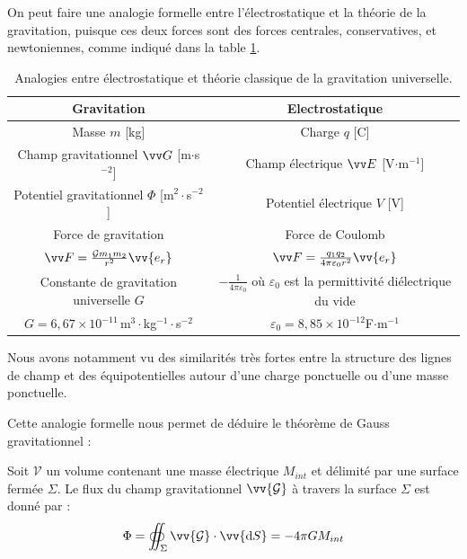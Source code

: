 \documentclass[11pt,fleqn]{book} %
\newcommand{\dd}{\mathrm{d}}
\begin{document}
On peut faire une analogie formelle entre l'électrostatique et la théorie de la gravitation, puisque ces deux forces sont des forces centrales, conservatives, et newtoniennes, comme indiqué dans la table \ref{tab:analogie}.

\begin{table}[htbp]
\centering
\begin{tabular}{cc}
\toprule
\textbf{Gravitation} & \textbf{Electrostatique}\\
\midrule
Masse $m$ [kg] & Charge $q$ [C] \\
\midrule
Champ gravitationnel $\vv G$ [m$\cdot$s$^{-2}$] & Champ électrique $\vv E$ [V$\cdot$m$^{-1}$] \\
\midrule
Potentiel gravitationnel $\Phi$ [m$^2\cdot$s$^{-2}$] & Potentiel électrique $V$ [V] \\
\midrule
Force de gravitation & Force de Coulomb \\
$\vv F = \frac{\mathcal{G} m_1 m_2}{r^2} \vv{e_r}$ & $\vv F = \frac{q_1 q_2}{4 \pi \varepsilon_0 r^2} \vv{e_r}$ \\
\midrule
Constante de gravitation universelle $G$ &  $-\frac{1}{4 \pi \varepsilon_0}$ où $\varepsilon_0$ est la permittivité diélectrique du vide  \\
$G = 6,67 \times 10^{-11}$\,m$^3 \cdot$kg$^{-1} \cdot$s$^{-2}$ & $\varepsilon_0 = 8,85 \times 10^{-12}$F$ \cdot$m$^{-1}$ \\
\bottomrule
\end{tabular}
\caption{Analogies entre électrostatique et théorie classique de la gravitation universelle.}
\label{tab:analogie}
\end{table}

Nous avons notamment vu des similarités très fortes entre la structure des lignes de champ et des équipotentielles autour d'une charge ponctuelle ou d'une masse ponctuelle.

Cette analogie formelle nous permet de déduire le théorème de Gauss gravitationnel :
\begin{theorem}
    Soit $\mathcal{V}$ un volume contenant une masse électrique $M_{int}$ et délimité par une surface fermée $\Sigma$. Le flux du champ gravitationnel $\vv{\mathcal{G}}$ à travers la surface $\Sigma$ est donné par :
    \begin{equation}
        \Phi = \oiint_\Sigma \vv{\mathcal{G}} \cdot \vv{\dd S} = - 4 \pi G M_{int}
    \end{equation}
\end{theorem}
\end{document}
